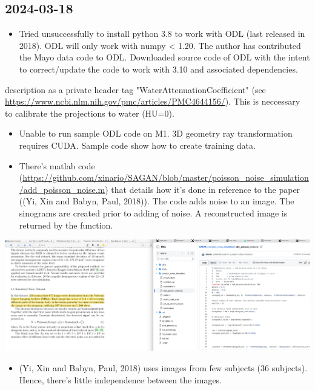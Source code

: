 \documentclass[a4paper, 11pt]{article}
\begin{document}
\subsection{2024-03-18}
\label{sec:org241c149}
\begin{itemize}
\item Tried unsuccessfully to install python 3.8 to work with ODL (last released in 2018). ODL will only work with numpy < 1.20. The author has contributed the Mayo data code to ODL. Downloaded source code of ODL with the intent to correct/update the code to work with 3.10 and associated dependencies.
\end{itemize}
description as a private header tag "WaterAttenuationCoefficient" (see \url{https://www.ncbi.nlm.nih.gov/pmc/articles/PMC4644156/}). This is neccessary to calibrate the projections to water (HU=0).
\begin{itemize}
\item Unable to run sample ODL code on M1. 3D geometry ray transformation requires CUDA. Sample code show how to create training data.
\item There's matlab code  (\url{https://github.com/xinario/SAGAN/blob/master/poisson\_noise\_simulation/add\_poisson\_noise.m}) that details how it's done in reference to the paper ((Yi, Xin and Babyn, Paul, 2018)). The code adds noise to an image. The sinograms are created prior to adding of noise. A reconstructed image is returned by the function.
\end{itemize}

\begin{center}
\includegraphics[width=.9\linewidth]{20240318-192545_screenshot.png}
\end{center}

\begin{itemize}
\item (Yi, Xin and Babyn, Paul, 2018) uses images from few subjects (36 subjects). Hence, there's little independence between the images.
\end{itemize}
\end{document}
